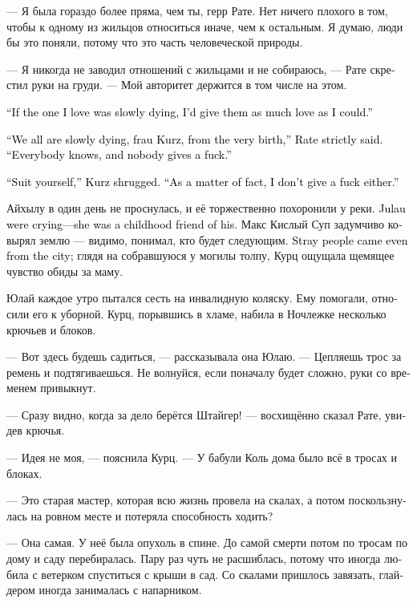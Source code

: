 \documentclass[a4paper,12pt,fleqn]{book}\usepackage{cooltooltips}\usepackage{polyglossia}\setdefaultlanguage[babelshorthands=true]{russian}\setotherlanguage{english}\defaultfontfeatures{Ligatures=TeX,Mapping=tex-text} \usepackage{xcolor}\definecolor{lightgray}{HTML}{bbbbbb}\color{lightgray}\newcommand{\ml}[3]{\textenglish{\textcolor{black}{#3}}}
\newcommand{\textspace}{\vspace{1em}{\centering\Large\bfseries<...>\par}\vspace{1em}}
\begin{document}
--- Я была гораздо более пряма, чем ты, герр Рате.
Нет ничего плохого в том, чтобы к одному из жильцов относиться иначе, чем к остальным.
Я думаю, люди бы это поняли, потому что это часть человеческой природы.

--- Я никогда не заводил отношений с жильцами и не собираюсь, --- Рате скрестил руки на груди.
--- Мой авторитет держится в том числе на этом.

\ml{$0$}
{--- Если бы человек, которого я люблю, медленно умирал, я хотела бы отдать ему как можно больше любви.}
{``If the one I love was slowly dying, I'd give them as much love as I could.''}

\ml{$0$}
{--- Все мы медленно умираем, фрау Курц, с самого рождения, --- строго сказал Рате.}
{``We all are slowly dying, frau Kurz, from the very birth,'' Rate strictly said.}
\ml{$0$}
{--- Все об этом знают, и всем плевать.}
{``Everybody knows, and nobody gives a fuck.''}

\ml{$0$}
{--- Дело твоё, --- пожала плечами Курц.}
{``Suit yourself,'' Kurz shrugged.}
\ml{$0$}
{--- Мне, в общем-то, тоже плевать.}
{``As a matter of fact, I don't give a fuck either.''}

Айхылу в один день не проснулась, и её торжественно похоронили у реки.
\ml{$0$}
{Юлай плакал --- она была его подругой детства.}
{Julau were crying---she was a childhood friend of his.}
Макс Кислый Суп задумчиво ковырял землю --- видимо, понимал, кто будет следующим.
\ml{$0$}
{Бездомные пришли даже из города;}
{Stray people came even from the city;}
глядя на собравшуюся у могилы толпу, Курц ощущала щемящее чувство обиды за маму.

\textspace

Юлай каждое утро пытался сесть на инвалидную коляску.
Ему помогали, относили его к уборной.
Курц, порывшись в хламе, набила в Ночлежке несколько крючьев и блоков.

--- Вот здесь будешь садиться, --- рассказывала она Юлаю.
--- Цепляешь трос за ремень и подтягиваешься.
Не волнуйся, если поначалу будет сложно, руки со временем привыкнут.

--- Сразу видно, когда за дело берётся Штайгер! --- восхищённо сказал Рате, увидев крючья.

--- Идея не моя, --- пояснила Курц.
--- У бабули Коль дома было всё в тросах и блоках.

--- Это старая мастер, которая всю жизнь провела на скалах, а потом поскользнулась на ровном месте и потеряла способность ходить?

--- Она самая.
У неё была опухоль в спине.
До самой смерти потом по тросам по дому и саду перебиралась.
Пару раз чуть не расшиблась, потому что иногда любила с ветерком спуститься с крыши в сад.
Со скалами пришлось завязать, глайдером иногда занималась с напарником.
\end{document}

